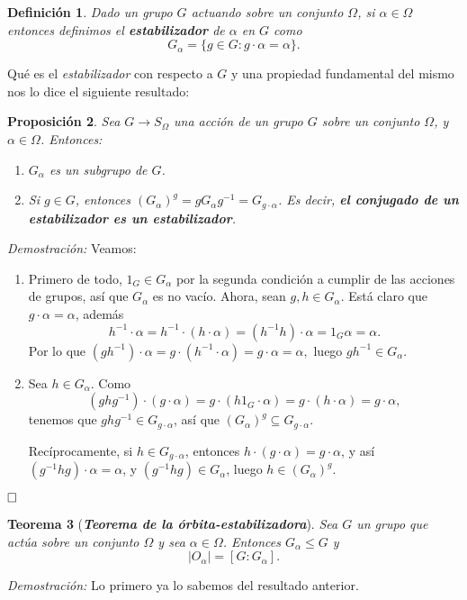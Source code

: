 \documentclass[12pt]{article}
\newtheorem{theorem}{Teorema}[section]
\newtheorem{proposition}[theorem]{Proposición}
\newtheorem{definition}[theorem]{Definición}
\begin{document}
\begin{definition}Dado un grupo $G$ actuando sobre un conjunto $\Omega$, si $\alpha \in \Omega$ entonces definimos el \textbf{estabilizador} de $\alpha$ en $G$ como $$G_\alpha = \lbrace g \in G : g\cdot \alpha = \alpha \rbrace.$$
\end{definition}

Qué es el \textit{estabilizador} con respecto a $G$ y una propiedad fundamental del mismo nos lo dice el siguiente resultado:

\begin{proposition}\label{eq:coest}
Sea $G \longrightarrow S_\Omega$ una acción de un grupo $G$ sobre un conjunto $\Omega$, y $\alpha \in \Omega$. Entonces:

\begin{enumerate}
\item $G_{\alpha}$ es un subgrupo de $G$.
\item Si $g \in G$, entonces $(G_{\alpha})^{g} = gG_{\alpha}g^{-1} = G_{g \cdot \alpha}$. Es decir, \textbf{el conjugado de un estabilizador es un estabilizador}.
\end{enumerate}
\end{proposition}
\emph{Demostración: }Veamos:
\begin{enumerate}
\item Primero de todo, $1_{G} \in G_{\alpha}$ por la segunda condición a cumplir de las acciones de grupos, así que $G_{\alpha}$ es no vacío. Ahora, sean $g,h \in G_{\alpha}$. Está claro que $g \cdot \alpha = \alpha$, además $$h^{-1} \cdot \alpha = h^{-1}\cdot(h \cdot \alpha) = (h^{-1}h)\cdot \alpha = 1_{G} \alpha = \alpha.$$ Por lo que $(gh^{-1})\cdot \alpha= g\cdot(h^{-1}\cdot \alpha) = g\cdot \alpha= \alpha,$ luego $gh^{-1} \in G_{\alpha}.$
\item Sea $h \in G_{\alpha}$. Como  $$(ghg^{-1})\cdot(g\cdot \alpha) = g\cdot(h1_{G}\cdot \alpha)= g\cdot(h\cdot \alpha) = g\cdot \alpha,$$ tenemos que $ghg^{-1} \in G_{g\cdot \alpha}$, así que $(G_{\alpha})^{g} \subseteq G_{g\cdot \alpha}$.

Recíprocamente, si $h \in G_{g \cdot \alpha}$, entonces $h\cdot(g \cdot \alpha) = g \cdot \alpha$, y así $(g^{-1}hg)\cdot \alpha = \alpha$, y $(g^{-1}hg) \in G_{\alpha}$, luego $h \in (G_{\alpha})^{g}.$
\end{enumerate}

$\hfill \square$

\begin{theorem}[\textbf{\textit{Teorema de la órbita-estabilizadora}}] \label{eq:torest}
Sea $G$ un grupo que actúa sobre un conjunto $\Omega$ y sea $\alpha \in \Omega$. Entonces $G_\alpha \leq G$ y $$|O_\alpha| = [G:G_\alpha].$$
\end{theorem}
\emph{Demostración: }Lo primero ya lo sabemos del resultado anterior.
\end{document}
